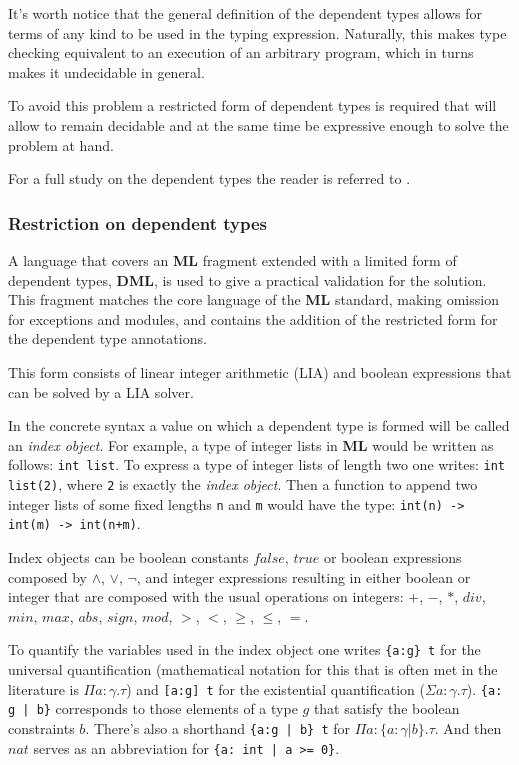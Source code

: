 \documentclass[a4paper,UKenglish]{lipics-v2016}
\begin{document}
It's worth notice that the general definition of the dependent types allows for
terms of any kind to be used in the typing expression. Naturally, this makes
type checking equivalent to an execution of an arbitrary program, which in
turns makes it undecidable in general.

To avoid this problem a restricted form of dependent types is required that
will allow to remain decidable and at the same time be expressive enough to
solve the problem at hand.

For a full study on the dependent types the reader is referred to
\cite{Hofmann97syntaxand}.

\subsubsection{Restriction on dependent types}

A language that covers an \textbf{ML} fragment extended with a limited form of
dependent types, \textbf{DML}, is used to give a practical validation for the
solution. This fragment matches the core language of the \textbf{ML} standard,
making omission for exceptions and modules, and contains the addition of the
restricted form for the dependent type annotations.

This form consists of linear integer arithmetic (LIA) and boolean expressions
that can be solved by a LIA solver.

In the concrete syntax a value on which a dependent type is formed will be
called an \emph{index object}. For example, a type of integer lists in
\textbf{ML} would be written as follows: \texttt{int list}. To express a type
of integer lists of length two one writes: \texttt{int list(2)}, where
\texttt{2} is exactly the \emph{index object}. Then a function to append two
integer lists of some fixed lengths \texttt{n} and \texttt{m} would have the
type: \texttt{int(n) -> int(m) -> int(n+m)}.

Index objects can be boolean constants $false$, $true$ or boolean expressions
composed by $\land$, $\lor$, $\neg$, and integer expressions resulting in
either boolean or integer that are composed with the usual operations on
integers: $+$, $-$, $*$, $div$, $min$, $max$, $abs$, $sign$, $mod$, $>$, $<$,
$\ge$, $\le$, $=$.

To quantify the variables used in the index object one writes \texttt{\{a:g\}
t} for the universal quantification (mathematical notation for this that is
often met in the literature is $\Pi a: \gamma.  \tau$) and \texttt{[a:g] t} for
the existential quantification ($\Sigma a: \gamma. \tau$).  \texttt{\{a: g | b\}}
corresponds to those elements of a type $g$ that satisfy the boolean
constraints $b$. There's also a shorthand \texttt{\{a:g | b\} t} for $\Pi a:
\{a: \gamma | b\}. \tau$. And then $nat$ serves as an abbreviation for
\texttt{\{a: int | a >= 0\}}.
\end{document}
